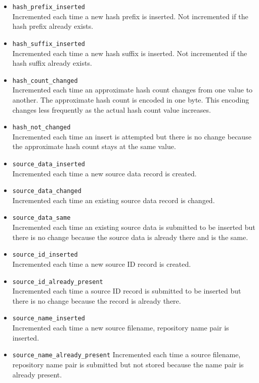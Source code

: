 \documentclass[11pt,fleqn]{article} %
\begin{document}
\begin{itemize}
\item \verb+hash_prefix_inserted+\\
Incremented each time a new hash prefix is inserted. Not incremented if the hash prefix already exists.
\item \verb+hash_suffix_inserted+\\
Incremented each time a new hash suffix is inserted. Not incremented if the hash suffix already exists.
\item \verb+hash_count_changed+\\
Incremented each time an approximate hash count changes from one value to another. The approximate hash count is encoded in one byte. This encoding changes less frequently as the actual hash count value increases.
\item \verb+hash_not_changed+\\
Incremented each time an insert is attempted but there is no change because the approximate hash count stays at the same value.

\item \verb+source_data_inserted+\\
Incremented each time a new source data record is created.
\item \verb+source_data_changed+\\
Incremented each time an existing source data record is changed.
\item \verb+source_data_same+\\
Incremented each time an existing source data is submitted to be inserted but there is no change because the source data is already there and is the same.

\item \verb+source_id_inserted+\\
Incremented each time a new source ID record is created.
\item \verb+source_id_already_present+\\
Incremented each time a source ID record is submitted to be inserted but there is no change because the record is already there.

\item \verb+source_name_inserted+\\
Incremented each time a new source filename, repository name pair is inserted.
\item \verb+source_name_already_present+
Incremented each time a source filename, repository name pair is submitted but not stored because the name pair is already present.
\end{itemize}
\end{document}
